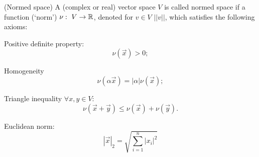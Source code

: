 \begin{definition}{(Normed space)}{}
    A (complex or real) vector space $V$ is called normed space if a function (`norm') $\nu: \ V \to \mathbb{R}$, denoted for $v \in V$ $||v||$, which satisfies the following axioms:
    \begin{enumerate*}
        \item Positive definite property:
        \[ 
            \nu\left(\vec{x}\right) > 0;
        \]
        \item Homogeneity \[
            \nu\left(\alpha \vec{x}\right) = |\alpha|\nu\left(\vec{x}\right);
        \]
        \item Triangle inequality $\forall x, y \in V$:
        \[ 
            \nu\left(\vec{x} + \vec{y}\right) \leq \nu\left(\vec{x}\right) + \nu\left(\vec{y}\right).
        \]
    \end{enumerate*}
\end{definition}
\Ex Euclidean norm:
        \[
            \left|\vec{x}\right|_2 = \sqrt{\sum\limits_{i=1}^n |x_i|^2}    
        \]

